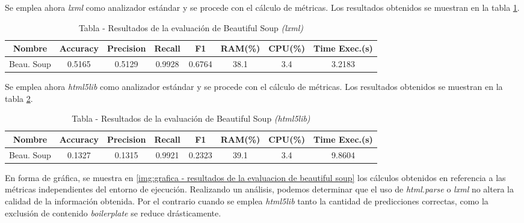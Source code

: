 Se emplea ahora \emph{lxml} como analizador estándar y se procede con el cálculo de métricas. Los resultados
obtenidos se muestran en la tabla \ref{tab:tabla - resultados de la evaluacion de beautiful soup lxml}.

\begin{table}[h]
    \begin{center}
      \begin{tabular}{| c | c | c | c | c | c | c | c |} \hline 
       \textbf{Nombre} & \textbf{Accuracy} & \textbf{Precision}  & \textbf{Recall} & \textbf{F1} & \textbf{RAM(\%)} & \textbf{CPU(\%)} & \textbf{Time Exec.(s)} \\ \hline
       Beau. Soup & 0.5165 & 0.5129 & 0.9928 & 0.6764 & 38.1 & 3.4 & 3.2183 \\ \hline
      \end{tabular}
      \caption{Tabla - Resultados de la evaluación de Beautiful Soup \emph{(lxml)}}
      \label{tab:tabla - resultados de la evaluacion de beautiful soup lxml}
    \end{center}
\end{table}

Se emplea ahora \emph{html5lib} como analizador estándar y se procede con el cálculo de métricas. Los 
resultados obtenidos se muestran en la tabla 
\ref{tab:tabla - resultados de la evaluacion de beautiful soup html5lib}.

\begin{table}[h]
    \begin{center}
      \begin{tabular}{| c | c | c | c | c | c | c | c |} \hline 
       \textbf{Nombre} & \textbf{Accuracy} & \textbf{Precision}  & \textbf{Recall} & \textbf{F1} & \textbf{RAM(\%)} & \textbf{CPU(\%)} & \textbf{Time Exec.(s)} \\ \hline
       Beau. Soup & 0.1327 & 0.1315 & 0.9921 & 0.2323 & 39.1 & 3.4 & 9.8604 \\ \hline
      \end{tabular}
      \caption{Tabla - Resultados de la evaluación de Beautiful Soup \emph{(html5lib)}}
      \label{tab:tabla - resultados de la evaluacion de beautiful soup html5lib}
    \end{center}
\end{table}

En forma de gráfica, se muestra en \ref{img:grafica - resultados de la evaluacion de beautiful soup} los 
cálculos obtenidos en referencia a las métricas independientes del entorno de ejecución. Realizando un
análisis, podemos determinar que el uso de \emph{html.parse} o \emph{lxml} no altera la calidad de la 
información obtenida. Por el contrario cuando se emplea \emph{html5lib} tanto la cantidad de predicciones 
correctas, como la exclusión de contenido \emph{boilerplate} se reduce drásticamente.

